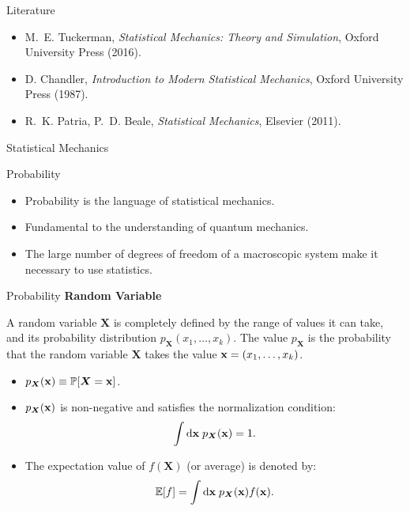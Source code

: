 \documentclass[10pt]{beamer}
\newcommand{\emphbox}[1]{%
\noindent\colorbox{shade}{%
\begin{minipage}{\dimexpr\linewidth-2\fboxsep}#1\end{minipage}}}
\begin{document}
\begin{frame}{Literature}
\begin{itemize}
\setlength\itemsep{1em}
  \item M.~E. Tuckerman, \textit{Statistical Mechanics: Theory and Simulation}, Oxford University Press (2016).
  \item D. Chandler, \textit{Introduction to Modern Statistical Mechanics}, Oxford University Press (1987).
  \item R.~K. Patria, P.~D. Beale, \textit{Statistical Mechanics}, Elsevier (2011).
\end{itemize}
\end{frame}

\begin{frame}{}
  \begin{center}
    \fontsize{25pt}{6}\selectfont\vspace{1.2cm}
    \textcolor{subtitle}{Statistical Mechanics}
  \end{center}
\end{frame}

\begin{frame}{Probability}
\begin{itemize}
\setlength\itemsep{1em}
  \item Probability is the language of statistical mechanics.
  \item Fundamental to the understanding of quantum mechanics.
  \item The large number of degrees of freedom of a macroscopic system make it necessary to use statistics.
\end{itemize}
\end{frame}

\begin{frame}{Probability}
\textbf{Random Variable}\vspace{0.2cm}
\emphbox{%
  A random variable $\boldsymbol{X}$ is completely defined by the range of values it can take, and its probability distribution $p_{\boldsymbol{X}}(x_1,\dots,x_k)$. The value $p_{\boldsymbol{X}}$ is the probability that the random variable $\boldsymbol{X}$ takes the value ${\bf x}=(x_1,\dots,x_k)$.}
\vspace{0.2cm}

\begin{itemize}
\setlength\itemsep{1em}
  \item $p_{\boldsymbol{X}}({\bf x}) \equiv \mathbb{P}[\boldsymbol{X} = {\bf x}]$.

  \item $p_{\boldsymbol{X}}({\bf x})$ is non-negative and satisfies the normalization condition:
  \begin{equation}
    \int\mathrm{d}{\bf x}\; p_{\boldsymbol{X}}({\bf x})=1.
  \end{equation}

  \item The expectation value of $f(\boldsymbol{X})$ (or average) is denoted by:
  \begin{equation}
    \mathbb{E}[f]=\int\mathrm{d}{\bf x}\; p_{\boldsymbol{X}}({\bf x})f({\bf x}).
  \end{equation}
\end{itemize}
\end{frame}
\end{document}
